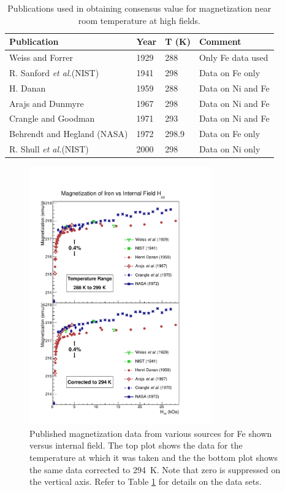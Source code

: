 \documentclass[preprint,12pt]{elsarticle}
\begin{document}
\begin{table}[h]
\caption{\label{tab:magnetization_pubs}Publications used in obtaining consensus value for magnetization near room temperature at high fields.}
\begin{center}
\begin{tabular}{|l|l|l|l|}\hline
Publication & Year & T (K) & Comment\\\hline
Weiss and Forrer \cite{Weiss1929} & 1929 & 288 & Only Fe data used\\
R. Sanford {\it et al.}(NIST)\cite{Sanford1941} & 1941 & 298 & Data on Fe only\\
H. Danan \cite{Danan1959} & 1959 & 288 & Data on Ni and Fe\\
Arajs and Dunmyre \cite{Arajs1967}& 1967 & 298 & Data on Ni and Fe\\
Crangle and Goodman \cite{Crangle1971} & 1971 & 293 & Data on Ni and Fe\\
Behrendt and Hegland (NASA)\cite{Behrendt1972} & 1972 & 298.9 & Data on Fe only\\
R. Shull {\it et al.}(NIST) & 2000 & 298 & Data on Ni only\\\hline
\end{tabular}
\end{center}
\end{table}
\begin{figure}[ht!]
\centering
\includegraphics[width=0.7\textwidth]{FeMagnetization_vs_Hint.pdf}
\caption{Published magnetization data from various sources for Fe shown versus internal field. The top plot shows the data for the temperature at which it was taken and the the bottom plot shows the same data corrected to 294~K. Note that zero is suppressed on the vertical axis. Refer to Table \ref{tab:magnetization_pubs} for details on the data sets.}
\label{fig:mag_Fe}
\end{figure}
\end{document}
